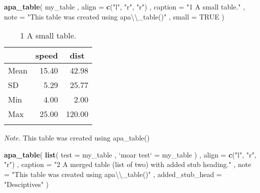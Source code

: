 \documentclass[english,man]{apa6}
\newenvironment{Shaded}{\begin{snugshade}}{\end{snugshade}}
\newcommand{\KeywordTok}[1]{\textcolor[rgb]{0.13,0.29,0.53}{\textbf{{#1}}}}
\newcommand{\DataTypeTok}[1]{\textcolor[rgb]{0.13,0.29,0.53}{{#1}}}
\newcommand{\CharTok}[1]{\textcolor[rgb]{0.31,0.60,0.02}{{#1}}}
\newcommand{\StringTok}[1]{\textcolor[rgb]{0.31,0.60,0.02}{{#1}}}
\newcommand{\OtherTok}[1]{\textcolor[rgb]{0.56,0.35,0.01}{{#1}}}
\newcommand{\NormalTok}[1]{{#1}}
\begin{document}
\begin{Shaded}
\begin{Highlighting}[]
\KeywordTok{apa_table}\NormalTok{(}
  \NormalTok{my_table}
  \NormalTok{, }\DataTypeTok{align =} \KeywordTok{c}\NormalTok{(}\StringTok{"l"}\NormalTok{, }\StringTok{"r"}\NormalTok{, }\StringTok{"r"}\NormalTok{)}
  \NormalTok{, }\DataTypeTok{caption =} \StringTok{"1 A small table."}
  \NormalTok{, }\DataTypeTok{note =} \StringTok{"This table was created using apa}\CharTok{\textbackslash{}\textbackslash{}}\StringTok{_table()"}
  \NormalTok{, }\DataTypeTok{small =} \OtherTok{TRUE}
\NormalTok{)}
\end{Highlighting}
\end{Shaded}

\begin{table}[tbp]
\begin{center}
\begin{threeparttable}
\caption{\label{tab:unnamed-chunk-2}1 A small table.}
\small{
\begin{tabular}{lrr}
\toprule
 & \multicolumn{1}{c}{speed} & \multicolumn{1}{c}{dist}\\
\midrule
Mean & 15.40 & 42.98\\
SD & 5.29 & 25.77\\
Min & 4.00 & 2.00\\
Max & 25.00 & 120.00\\
\bottomrule
\addlinespace
\end{tabular}
}
\begin{tablenotes}[para]
\textit{Note.} This table was created using apa\_table()
\end{tablenotes}
\end{threeparttable}
\end{center}
\end{table}

\begin{Shaded}
\begin{Highlighting}[]
\KeywordTok{apa_table}\NormalTok{(}
  \KeywordTok{list}\NormalTok{(}
    \DataTypeTok{test =} \NormalTok{my_table}
    \NormalTok{, }\StringTok{`}\DataTypeTok{moar test}\StringTok{`} \NormalTok{=}\StringTok{ }\NormalTok{my_table}
  \NormalTok{)}
  \NormalTok{, }\DataTypeTok{align =} \KeywordTok{c}\NormalTok{(}\StringTok{"l"}\NormalTok{, }\StringTok{"r"}\NormalTok{, }\StringTok{"r"}\NormalTok{)}
  \NormalTok{, }\DataTypeTok{caption =} \StringTok{"2 A merged table (list of two) with added stub heading."}
  \NormalTok{, }\DataTypeTok{note =} \StringTok{"This table was created using apa}\CharTok{\textbackslash{}\textbackslash{}}\StringTok{_table()"}
  \NormalTok{, }\DataTypeTok{added_stub_head =} \StringTok{"Desciptives"}
\NormalTok{)}
\end{Highlighting}
\end{Shaded}
\end{document}
